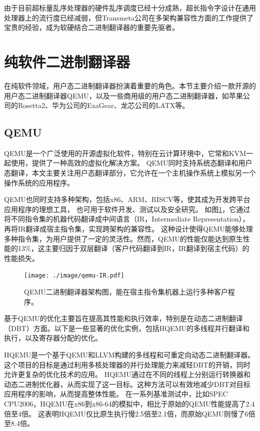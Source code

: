 由于目前超标量乱序处理器的硬件乱序调度已经十分成熟，超长指令字设计在通用处理器上的流行度已经减弱，但Transmeta公司在多架构兼容性方面的工作提供了宝贵的经验，成为软硬结合二进制翻译器的重要先驱者。

\section{纯软件二进制翻译器}

在纯软件领域，用户态二进制翻译器扮演着重要的角色。本节主要介绍一款开源的用户态二进制翻译器QEMU，以及一些商用级的用户态二进制翻译器，如苹果公司的Rosetta2、华为公司的ExaGear、龙芯公司的LATX等。

\subsection{QEMU}

QEMU是一个广泛使用的开源虚拟化软件，特别在云计算环境中，它常和KVM一起使用，提供了一种高效的虚拟化解决方案。
QEMU同时支持系统态翻译和用户态翻译，本文主要关注用户态翻译部分，它允许在一个主机操作系统上模拟另一个操作系统的应用程序。

QEMU也同时支持多种架构，包括x86、ARM、RISCV等，使其成为开发跨平台应用程序的理想工具， 也可用于软件开发、测试以及安全研究。
如图\ref{img:qemu_arch}，它通过将不同指令集的机器代码翻译成中间语言（IR，Intermediate Representation），再将IR翻译成宿主指令集，实现跨架构的兼容性。
这种设计使得QEMU能够处理多种指令集，为用户提供了一定的灵活性。然而，QEMU的性能仅能达到原生性能的13\%，这主要归因于双层翻译（客户代码翻译到IR，IR翻译到宿主代码）的性能损失。

\begin{figure}[!htbp]
  \centering
  \texttt{[image: ./image/qemu-IR.pdf]}
  \caption{QEMU二进制翻译器架构图，能在宿主指令集机器上运行多种客户程序。}
  \label{img:qemu_arch}
\end{figure}

基于QEMU的优化主要旨在提高其性能和执行效率，特别是在动态二进制翻译（DBT）方面。以下是一些显著的优化实例，包括HQEMU的多线程并行翻译和执行，以及寄存器分配的优化。

HQEMU\cite{Hong2012HQEMUAM}是一个基于QEMU和LLVM构建的多线程和可重定向动态二进制翻译器。这个项目的目标是通过利用多核处理器的并行处理能力来减轻DBT的开销，同时允许更复杂的优化技术的应用。
HQEMU通过在不同的线程上分别运行转换器和动态二进制优化器，从而实现了这一目标。这种方法可以有效地减少DBT对目标应用程序的影响，从而提高整体性能。
在一系列基准测试中，比如SPEC CPU2006，HQEMU在x86到x86-64的模拟中，相比于原始的QEMU性能提高了2.4倍至4倍。
这表明HQEMU仅比原生执行慢2.5倍至2.1倍，而原始QEMU则慢了6倍至8.4倍。

